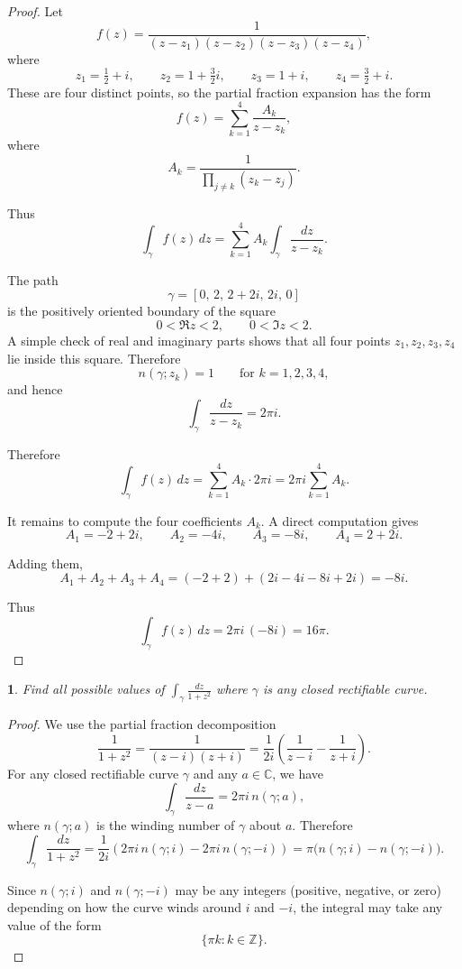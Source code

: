 \documentclass[12pt, a4paper]{report}
\theoremstyle{spaced}
\newtheorem{exercise}{}
\newcommand{\setexercise}[1]{\setcounter{exercise}{#1-1}}
\begin{document}
\begin{proof}
	Let
	\[
		f(z)=\frac{1}{
			(z-z_1)(z-z_2)(z-z_3)(z-z_4)},
	\]
	where
	\[
		z_1=\tfrac12+i,\qquad
		z_2=1+\tfrac32 i,\qquad
		z_3=1+i,\qquad
		z_4=\tfrac32+i.
	\]
	These are four distinct points, so the partial fraction expansion has the form
	\[
		f(z)=
		\sum_{k=1}^4
		\frac{A_k}{z-z_k},
	\]
	where
	\[
		A_k=\frac{1}{
			\displaystyle \prod_{j\ne k}(z_k-z_j)}.
	\]

	Thus
	\[
		\int_\gamma f(z)\,dz
		=\sum_{k=1}^4 A_k
		\int_\gamma \frac{dz}{z-z_k}.
	\]

	The path
	\[
		\gamma=[0,\,2,\,2+2i,\,2i,\,0]
	\]
	is the positively oriented boundary of the square
	\[
		0<\Re z<2,\qquad 0<\Im z<2.
	\]
	A simple check of real and imaginary parts shows that all four points
	\(z_1,z_2,z_3,z_4\) lie inside this square.
	Therefore
	\[
		n(\gamma;z_k)=1
		\qquad\text{for }k=1,2,3,4,
	\]
	and hence
	\[
		\int_\gamma \frac{dz}{z-z_k}
		=2\pi i.
	\]

	Therefore
	\[
		\int_\gamma f(z)\,dz
		=\sum_{k=1}^4 A_k \cdot 2\pi i
		=
		2\pi i \sum_{k=1}^4 A_k.
	\]

	It remains to compute the four coefficients \(A_k\).  A direct computation gives
	\[
		A_1=-2+2i,\qquad
		A_2=-4i,\qquad
		A_3=-8i,\qquad
		A_4=2+2i.
	\]

	Adding them,
	\[
		A_1+A_2+A_3+A_4
		=(-2+2)+(2i-4i-8i+2i)
		=-8i.
	\]

	Thus
	\[
		\int_\gamma f(z)\,dz
		=2\pi i\,(-8i)
		=16\pi.
	\]
\end{proof}


\setexercise{10}
\begin{exercise}
	Find all possible values of $\displaystyle \int_{\gamma} \frac{dz}{1 + z^{2}}$ where $\gamma$ is any closed rectifiable curve.
\end{exercise}

\begin{proof}
	We use the partial fraction decomposition
	\[
		\frac{1}{1+z^{2}}
		=\frac{1}{(z-i)(z+i)}
		=\frac{1}{2i}\left(\frac{1}{z-i}-\frac{1}{z+i}\right).
	\]
	For any closed rectifiable curve $\gamma$ and any $a\in\mathbb{C}$, we have
	\[
		\int_\gamma \frac{dz}{z-a}
		= 2\pi i\, n(\gamma;a),
	\]
	where $n(\gamma;a)$ is the winding number of $\gamma$ about $a$.
	Therefore
	\[
		\int_\gamma \frac{dz}{1+z^{2}}
		=\frac{1}{2i}
		\left(2\pi i\, n(\gamma;i) - 2\pi i\, n(\gamma;-i)\right)
		=\pi\bigl(n(\gamma;i)-n(\gamma;-i)\bigr).
	\]

	Since $n(\gamma;i)$ and $n(\gamma;-i)$ may be any integers (positive, negative, or zero)
	depending on how the curve winds around $i$ and $-i$, the integral may take any value of the form
	\[
		\{\pi k : k\in\mathbb{Z}\}.
	\]
\end{proof}
\end{document}
